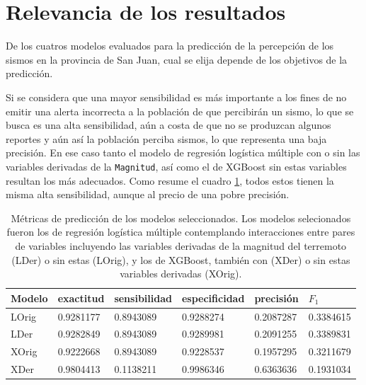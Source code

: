 \documentclass[a4paper]{report}
\begin{document}
\section{Relevancia de los resultados}

De los cuatros modelos evaluados para la predicción de la percepción de los sismos en la provincia de San Juan, cual se elija depende de los objetivos de la predicción.

Si se considera que una mayor sensibilidad es más importante a los fines de no emitir una alerta incorrecta a la población de que percibirán un sismo, lo que se busca es una alta sensibilidad, aún a costa de que no se produzcan algunos reportes y aún así la población perciba sismos, lo que representa una baja precisión.
En ese caso tanto el modelo de regresión logística múltiple con o sin las variables derivadas de la \verb'Magnitud', así como el de XGBoost sin estas variables resultan los más adecuados.
Como resume el cuadro \ref{tab:metricas_modelos}, todos estos tienen la misma alta sensibilidad, aunque al precio de una pobre precisión.

\begin{table}[!ht]
	\centering
	\begin{tabular}{llllll}
	\toprule
	Modelo & exactitud & sensibilidad & especificidad & precisión & \(F_1\) \\
	\midrule
	LOrig & \num{0.9281177} & \num{0.8943089} & \num{0.9288274} & \num{0.2087287} & \num{0.3384615}\\
	LDer & \num{0.9282849} & \num{0.8943089} & \num{0.9289981} & \num{0.2091255} & \num{0.3389831}\\
	XOrig & \num{0.9222668} & \num{0.8943089} & \num{0.9228537} & \num{0.1957295} & \num{0.3211679} \\
	XDer & \num{0.9804413} & \num{0.1138211} & \num{0.9986346} & \num{0.6363636} & \num{0.1931034} \\
	\bottomrule
	\end{tabular}
	\caption{Métricas de predicción de los modelos seleccionados. Los modelos selecionados fueron los de regresión logística múltiple contemplando interacciones entre pares de variables incluyendo las variables derivadas de la magnitud del terremoto (LDer) o sin estas (LOrig), y los de XGBoost, también con (XDer) o sin estas variables derivadas (XOrig).}
	\label{tab:metricas_modelos}
\end{table}
\end{document}

